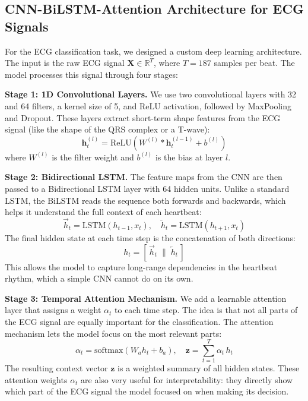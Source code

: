 \documentclass[10pt, twocolumn]{article}
\begin{document}
\subsection{CNN-BiLSTM-Attention Architecture for ECG Signals}

For the ECG classification task, we designed a custom deep learning architecture. The
input is the raw ECG signal $\mathbf{X} \in \mathbb{R}^T$, where $T = 187$ samples per beat.
The model processes this signal through four stages:

\textbf{Stage 1: 1D Convolutional Layers.}
We use two convolutional layers with 32 and 64 filters, a kernel size of 5, and ReLU activation,
followed by MaxPooling and Dropout. These layers extract short-term shape features from the
ECG signal (like the shape of the QRS complex or a T-wave):
\begin{equation}
  \mathbf{h}^{(l)}_t = \mathrm{ReLU}\!\left( W^{(l)} * \mathbf{h}^{(l-1)}_t + b^{(l)} \right)
\end{equation}
where $W^{(l)}$ is the filter weight and $b^{(l)}$ is the bias at layer $l$.

\textbf{Stage 2: Bidirectional LSTM.}
The feature maps from the CNN are then passed to a Bidirectional LSTM layer with 64 hidden
units. Unlike a standard LSTM, the BiLSTM reads the sequence both forwards and backwards,
which helps it understand the full context of each heartbeat:
\begin{equation}
  \overrightarrow{h}_t = \mathrm{LSTM}(h_{t-1}, x_t), \quad
  \overleftarrow{h}_t = \mathrm{LSTM}(h_{t+1}, x_t)
\end{equation}
The final hidden state at each time step is the concatenation of both directions:
\begin{equation}
  h_t = [\,\overrightarrow{h}_t \;\big\|\; \overleftarrow{h}_t\,]
\end{equation}
This allows the model to capture long-range dependencies in the heartbeat rhythm, which a
simple CNN cannot do on its own.

\textbf{Stage 3: Temporal Attention Mechanism.}
We add a learnable attention layer that assigns a weight $\alpha_t$ to each time step.
The idea is that not all parts of the ECG signal are equally important for the classification.
The attention mechanism lets the model focus on the most relevant parts:
\begin{equation}
  \alpha_t = \mathrm{softmax}(W_a h_t + b_a), \quad
  \mathbf{z} = \sum_{t=1}^{T} \alpha_t \, h_t
\end{equation}
The resulting context vector $\mathbf{z}$ is a weighted summary of all hidden states.
These attention weights $\alpha_t$ are also very useful for interpretability: they directly
show which part of the ECG signal the model focused on when making its decision.
\end{document}
